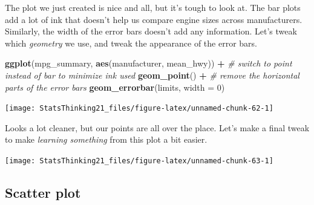 \documentclass[12pt,]{book}
\newenvironment{Shaded}{\begin{snugshade}}{\end{snugshade}}
\newcommand{\CommentTok}[1]{\textcolor[rgb]{0.56,0.35,0.01}{\textit{#1}}}
\newcommand{\DataTypeTok}[1]{\textcolor[rgb]{0.13,0.29,0.53}{#1}}
\newcommand{\DecValTok}[1]{\textcolor[rgb]{0.00,0.00,0.81}{#1}}
\newcommand{\KeywordTok}[1]{\textcolor[rgb]{0.13,0.29,0.53}{\textbf{#1}}}
\newcommand{\NormalTok}[1]{#1}
\newcommand{\OperatorTok}[1]{\textcolor[rgb]{0.81,0.36,0.00}{\textbf{#1}}}
\newcommand{\StringTok}[1]{\textcolor[rgb]{0.31,0.60,0.02}{#1}}
\begin{document}
The plot we just created is nice and all, but it's tough to look at. The bar plots add a lot of ink that doesn't help us compare engine sizes across manufacturers. Similarly, the width of the error bars doesn't add any information. Let's tweak which \emph{geometry} we use, and tweak the appearance of the error bars.

\begin{Shaded}
\begin{Highlighting}[]
\KeywordTok{ggplot}\NormalTok{(mpg_summary, }\KeywordTok{aes}\NormalTok{(manufacturer, mean_hwy)) }\OperatorTok{+}
\StringTok{  }\CommentTok{# switch to point instead of bar to minimize ink used}
\StringTok{  }\KeywordTok{geom_point}\NormalTok{() }\OperatorTok{+}\StringTok{ }
\StringTok{  }\CommentTok{# remove the horizontal parts of the error bars}
\StringTok{  }\KeywordTok{geom_errorbar}\NormalTok{(limits, }\DataTypeTok{width =} \DecValTok{0}\NormalTok{) }
\end{Highlighting}
\end{Shaded}

\texttt{[image: StatsThinking21\_files/figure-latex/unnamed-chunk-62-1]}

Looks a lot cleaner, but our points are all over the place. Let's make a final tweak to make \emph{learning something} from this plot a bit easier.

\begin{Shaded}
\end{Shaded}

\texttt{[image: StatsThinking21\_files/figure-latex/unnamed-chunk-63-1]}

\hypertarget{scatter-plot}{%
\subsection{Scatter plot}\label{scatter-plot}}
\end{document}

